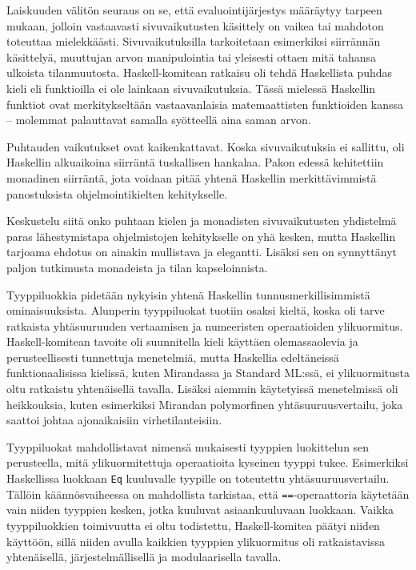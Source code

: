 \documentclass[finnish]{tktltiki2}
\begin{document}

Laiskuuden välitön seuraus on se, että evaluointijärjestys määräytyy tarpeen mukaan, jolloin vastaavasti sivuvaikutusten käsittely on vaikea tai mahdoton toteuttaa mielekkäästi. Sivuvaikutuksilla tarkoitetaan esimerkiksi siirrännän käsittelyä, muuttujan arvon manipulointia tai yleisesti ottaen mitä tahansa ulkoista tilanmuutosta. Haskell-komitean ratkaisu oli tehdä Haskellista puhdas kieli eli funktioilla ei ole lainkaan sivuvaikutuksia. Tässä mielessä Haskellin funktiot ovat merkitykseltään vastaavanlaisia matemaattisten funktioiden kanssa -- molemmat palauttavat samalla syötteellä aina saman arvon.

Puhtauden vaikutukset ovat kaikenkattavat. Koska sivuvaikutuksia ei sallittu, oli Haskellin alkuaikoina siirräntä tuskallisen hankalaa. Pakon edessä kehitettiin monadinen siirräntä, jota voidaan pitää yhtenä Haskellin merkittävimmistä panostuksista ohjelmointikielten kehitykselle.

Keskustelu siitä onko puhtaan kielen ja monadisten sivuvaikutusten yhdistelmä paras lähestymistapa ohjelmistojen kehitykselle on yhä kesken, mutta Haskellin tarjoama ehdotus on ainakin mullistava ja elegantti. Lisäksi sen on synnyttänyt paljon tutkimusta monadeista ja tilan kapseloinnista.


Tyyppiluokkia pidetään nykyisin yhtenä Haskellin tunnusmerkillisimmistä ominaisuuksista. Alunperin tyyppiluokat tuotiin osaksi kieltä, koska oli tarve ratkaista yhtäsuuruuden vertaamisen ja numeeristen operaatioiden ylikuormitus. Haskell-komitean tavoite oli suunnitella kieli käyttäen olemassaolevia ja perusteellisesti tunnettuja menetelmiä, mutta Haskellia edeltäneissä funktionaalisissa kielissä, kuten Mirandassa ja Standard ML:ssä, ei ylikuormitusta oltu ratkaistu yhtenäisellä tavalla. Lisäksi aiemmin käytetyissä menetelmissä oli heikkouksia, kuten esimerkiksi Mirandan polymorfinen yhtäsuuruusvertailu, joka saattoi johtaa ajonaikaisiin virhetilanteisiin.

Tyyppiluokat mahdollistavat nimensä mukaisesti tyyppien luokittelun sen perusteella, mitä ylikuormitettuja operaatioita kyseinen tyyppi tukee. Esimerkiksi Haskellissa luokkaan \texttt{Eq} kuuluvalle tyypille on toteutettu yhtäsuuruusvertailu. Tällöin käännösvaiheessa on mahdollista tarkistaa, että \texttt{==}-operaattoria käytetään vain niiden tyyppien kesken, jotka kuuluvat asiaankuuluvaan luokkaan. Vaikka tyyppiluokkien toimivuutta ei oltu todistettu, Haskell-komitea päätyi niiden käyttöön, sillä niiden avulla kaikkien tyyppien ylikuormitus oli ratkaistavissa yhtenäisellä, järjestelmällisellä ja modulaarisella tavalla.
\end{document}
